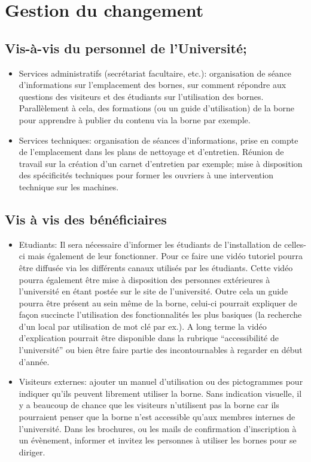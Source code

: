 \section{Gestion du changement}
\subsection{Vis-à-vis du personnel de l'Université;} 
  \begin{itemize}
    \item Services administratifs (secrétariat facultaire, etc.): organisation de séance d'informations sur l'emplacement des bornes, sur comment répondre aux questions des visiteurs et des étudiants sur l'utilisation des bornes. Parallèlement à cela, des formations (ou un guide d'utilisation) de la borne pour apprendre à publier du contenu via la borne par exemple. 
    \item Services techniques: organisation de séances d'informations, prise en compte de l'emplacement dans les plans de nettoyage et d'entretien. Réunion de travail sur la création d'un carnet d'entretien par exemple; mise à disposition des spécificités techniques pour former les ouvriers à une intervention technique sur les machines.
    \end{itemize}
\subsection{Vis à vis des bénéficiaires}
\begin{itemize}
    \item Etudiants: Il sera nécessaire d’informer les étudiants de l’installation de celles-ci mais également de leur fonctionner. Pour ce faire une vidéo tutoriel pourra être diffusée via les différents canaux utilisés par les étudiants. Cette vidéo pourra également être mise à disposition des personnes extérieures à l’université en étant postée sur le site de l’université. Outre cela un guide pourra être présent au sein même de la borne, celui-ci pourrait expliquer de façon succincte l’utilisation des fonctionnalités les plus basiques (la recherche d’un local par utilisation de mot clé par ex.). A long terme la vidéo d’explication pourrait être disponible dans la rubrique “accessibilité de l’université” ou bien être faire partie des incontournables à regarder en début d’année.
    \item Visiteurs externes: ajouter un manuel d'utilisation ou des pictogrammes pour indiquer qu'ils peuvent librement utiliser la borne. Sans indication visuelle, il y a beaucoup de chance que les visiteurs n'utilisent pas la borne car ils pourraient penser que la borne n'est accessible qu'aux membres internes de l'université. Dans les brochures, ou les mails de confirmation d'inscription à un évènement, informer et invitez les personnes à utiliser les bornes pour se diriger. 
\end{itemize}

